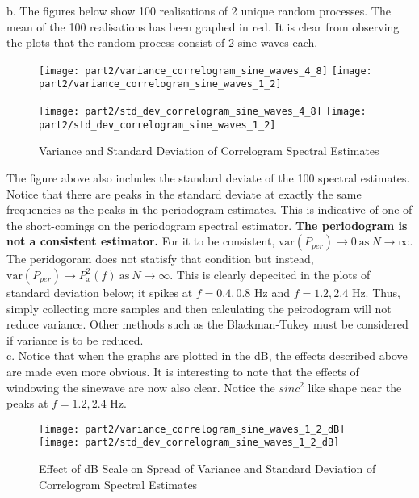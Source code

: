 \noindent{}b. The figures below show 100 realisations of 2 unique random processes. The mean of the 100 realisations has been graphed in red. It is clear from observing the plots that the random process consist of 2 sine waves each.

\begin{figure}[H]
\centering{}
\texttt{[image: part2/variance\_correlogram\_sine\_waves\_4\_8]}
\texttt{[image: part2/variance\_correlogram\_sine\_waves\_1\_2]}
\end{figure}

\begin{figure}[H]
\centering{}
\texttt{[image: part2/std\_dev\_correlogram\_sine\_waves\_4\_8]}
\texttt{[image: part2/std\_dev\_correlogram\_sine\_waves\_1\_2]}
\caption{Variance and Standard Deviation of Correlogram Spectral Estimates}
\end{figure}

\noindent{}The figure above also includes the standard deviate of the 100 spectral estimates. Notice that there are peaks in the standard deviate at exactly the same frequencies as the peaks in the periodogram estimates. This is indicative of one of the short-comings on the periodogram spectral estimator. \textbf{The periodogram is not a consistent estimator.} For it to be consistent, $\text{var}(P_{per}) \rightarrow 0  \ \text{as} \ N \rightarrow \infty$. The peridogoram does not statisfy that condition but instead,  $\text{var}(P_{per}) \rightarrow P_{x}^{2}(f) \ \text{as} \ N \rightarrow \infty$. This is clearly depecited in the plots of standard deviation below; it spikes at $f=0.4, 0.8$ Hz and $f=1.2, 2.4$ Hz. Thus, simply collecting more samples and then calculating the peirodogram will not reduce variance. Other methods such as the Blackman-Tukey must be considered if variance is to be reduced.\\

\noindent{}c. Notice that when the graphs are plotted in the dB, the effects described above are made even more obvious. It is interesting to note that the effects of windowing the sinewave are now also clear. Notice the $sinc^2$ like shape near the peaks at $f=1.2, 2.4$ Hz.
 
\begin{figure}[H]
\centering{}
\texttt{[image: part2/variance\_correlogram\_sine\_waves\_1\_2\_dB]}
\texttt{[image: part2/std\_dev\_correlogram\_sine\_waves\_1\_2\_dB]}
\caption{Effect of dB Scale on Spread of Variance and Standard Deviation of Correlogram Spectral Estimates}
\end{figure}

